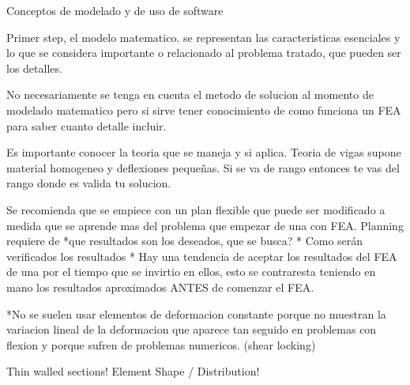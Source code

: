 Conceptos de modelado y de uso de software

Primer step, el modelo matematico. se representan las caracteristicas esenciales y lo
que se considera importante o relacionado al problema tratado, que pueden ser los detalles.

No necesariamente se tenga en cuenta el metodo de solucion al momento de modelado matematico
pero si sirve tener conocimiento de como funciona un FEA para saber cuanto detalle incluir.

Es importante conocer la teoria que se maneja y si aplica. Teoria de vigas supone material homogeneo y 
deflexiones pequeñas. Si se va de rango entonces te vas del rango donde es valida tu solucion.

Se recomienda que se empiece con un plan flexible que puede ser modificado a medida que se aprende mas del problema
que empezar de una con FEA. Planning requiere de 
*que resultados son los deseados, que se busca?
* Como serán verificados los resultados
* Hay una tendencia de aceptar los resultados del FEA de una por el tiempo que se invirtio en ellos,
esto se contraresta teniendo en mano los resultados aproximados ANTES de comenzar el FEA. 

*No se suelen usar elementos de deformacion constante porque no muestran la variacion lineal de la 
deformacion que aparece tan seguido en problemas con flexion y porque sufren de problemas numericos. 
(shear locking)

Thin walled sections!
Element Shape / Distribution!
